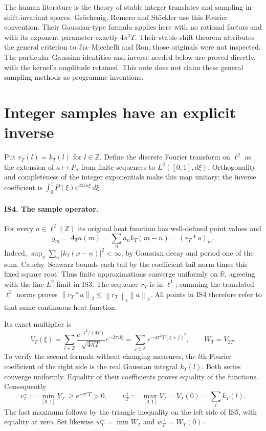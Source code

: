 \documentclass[11pt]{article}
\newcommand{\Z}{\mathbb Z}\newcommand{\C}{\mathbb C}\newcommand{\R}{\mathbb R}
\newcommand{\norm}[1]{\left\|#1\right\|}
\begin{document}
The human literature is the theory of stable integer translates and sampling in shift-invariant spaces. Gr\"ochenig, Romero and St\"ockler \cite[\S2.1, Theorem 2.1; \S5]{GRS} use this Fourier convention. Their Gaussian-type formula applies here with no rational factors and with its exponent parameter exactly $4\pi^2T$. Their stable-shift theorem attributes the general criterion to Jia--Micchelli and Ron; those originals were not inspected. The particular Gaussian identities and inverse needed below are proved directly, with the kernel's amplitude retained. This note does not claim these general sampling methods as programme inventions.

\section{Integer samples have an explicit inverse}
Put $r_T(l)=k_T(l)$ for $l\in\Z$. Define the discrete Fourier transform on $\ell^2$ as the extension of $a\mapsto P_a$ from finite sequences to $L^2([0,1],d\xi)$. Orthogonality and completeness of the integer exponentials make this map unitary; the inverse coefficient is $\int_0^1P(\xi)e^{2\pi in\xi}\,d\xi$.

\paragraph{IS4. The sample operator.}
For every $a\in\ell^2(\Z)$ its original heat function has well-defined point values and
\begin{equation}
y_m=A_Ta(m)=\sum_na_n k_T(m-n)=(r_T*a)_m. \tag{IS4}
\end{equation}
Indeed, $\sup_x\sum_n|k_T(x-n)|^2<\infty$, by Gaussian decay and period one of the sum. Cauchy--Schwarz bounds each tail by the coefficient tail norm times this fixed square root. Thus finite approximations converge uniformly on $\R$, agreeing with the line $L^2$ limit in IS3. The sequence $r_T$ is in $\ell^1$; summing the translated $\ell^2$ norms proves $\norm{r_T*a}_2\le\norm{r_T}_1\norm a_2$. All points in IS4 therefore refer to that same continuous heat function.

Its exact multiplier is
\begin{equation}
V_T(\xi)=\sum_{l\in\Z}\frac{e^{-l^2/(4T)}}{\sqrt{4\pi T}}e^{-2\pi il\xi}
 =\sum_{j\in\Z}e^{-4\pi^2T(\xi+j)^2},\qquad W_T=V_{2T}. \tag{IS5}
\end{equation}
To verify the second formula without changing measures, the $l$th Fourier coefficient of the right side is the real Gaussian integral $k_T(l)$. Both series converge uniformly. Equality of their coefficients proves equality of the functions. Consequently
\begin{equation}
v_T^-:=\min_{[0,1]}V_T\ \ge e^{-\pi^2T}>0,\qquad
v_T^+:=\max_{[0,1]}V_T=V_T(0)=\sum_lk_T(l). \tag{IS6}
\end{equation}
The last maximum follows by the triangle inequality on the left side of IS5, with equality at zero. Set likewise $w_T^-=\min W_T$ and $w_T^+=W_T(0)$.
\end{document}
